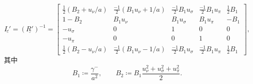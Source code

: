 \begin{equation}
\underline{L'}=(\underline{R'})^{-1}=\begin{bmatrix}\frac{1}{2}\left(B_{2}+u_{\nu}/a\right) & \frac{-1}{2}\left(B_{1}u_{\nu}+1/a\right) & \frac{-1}{2}B_{1}u_{\sigma} & \frac{-1}{2}B_{1}u_{\pi} & \frac{1}{2}B_{1}\\
1-B_{2} & B_{1}u_{\nu} & B_{1}u_{\sigma} & B_{1}u_{\pi} & -B_{1}\\
-u_{\sigma} & 0 & 1 & 0 & 0\\
-u_{\pi} & 0 & 0 & 1 & 0\\
\frac{1}{2}\left(B_{2}-u_{\nu}/a\right) & \frac{-1}{2}\left(B_{1}u_{\nu}-1/a\right) & \frac{-1}{2}B_{1}u_{\sigma} & \frac{-1}{2}B_{1}u_{\pi} & \frac{1}{2}B_{1}
\end{bmatrix},
\end{equation}
其中
\begin{equation}
B_{1}\coloneqq\frac{\gamma^{-}}{a^{2}},\qquad B_{2}\coloneqq B_{1}\frac{u_{\nu}^{2}+u_{\sigma}^{2}+u_{\pi}^{2}}{2}.
\end{equation}

